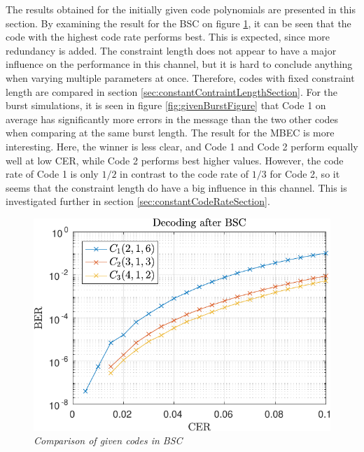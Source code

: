 The results obtained for the initially given code polynomials are presented in this section. By examining the result for the BSC on figure \ref{fig:givenRandomFigure}, it can be seen that the code with the highest code rate performs best. This is expected, since more redundancy is added. The constraint length does not appear to have a major influence on the performance in this channel, but it is hard to conclude anything when varying multiple parameters at once. Therefore, codes with fixed constraint length are compared in section \ref{sec:constantContraintLengthSection}.
For the burst simulations, it is seen in figure \ref{fig:givenBurstFigure} that Code 1 on average has significantly more errors in the message than the two other codes when comparing at the same burst length.
The result for the MBEC is more interesting. Here, the winner is less clear, and Code 1 and Code 2 perform equally well at low CER, while Code 2 performs best higher values. However, the code rate of Code 1 is only $1/2$ in contrast to the code rate of $1/3$ for Code 2, so it seems that the constraint length do have a big influence in this channel. This is investigated further in section  \ref{sec:constantCodeRateSection}.

\begin{figure}
\centering
\includegraphics[scale=1]{../figures/qirandom.pdf} 
\caption{\textit{Comparison of given codes in BSC}\label{fig:givenRandomFigure}}
\end{figure}

